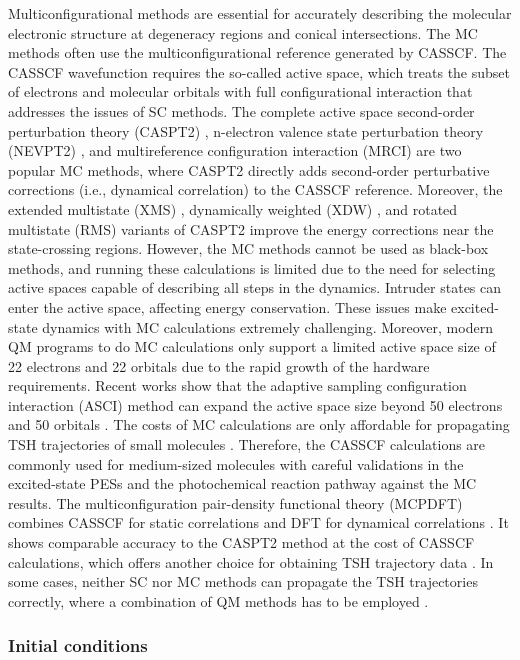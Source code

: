 \documentclass[9pt,bestpractices]{livecoms}
\begin{document}
Multiconfigurational methods are essential for accurately describing the molecular electronic structure at degeneracy regions and conical intersections. The MC methods often use the multiconfigurational reference generated by CASSCF. The CASSCF wavefunction requires the so-called active space, which treats the subset of electrons and molecular orbitals with full configurational interaction that addresses the issues of SC methods. The complete active space second-order perturbation theory (CASPT2) \cite{RN70}, n-electron valence state perturbation theory (NEVPT2) \cite{RN1}, and multireference configuration interaction (MRCI) \cite{RN117, RN56, RN57} are two popular MC methods, where CASPT2 directly adds second-order perturbative corrections (i.e., dynamical correlation) to the CASSCF reference. Moreover, the extended multistate (XMS) \cite{RN55}, dynamically weighted (XDW) \cite{RN54}, and rotated multistate (RMS) \cite{RN53} variants of CASPT2 improve the energy corrections near the state-crossing regions. However, the MC methods cannot be used as black-box methods, and running these calculations is limited due to the need for selecting active spaces capable of describing all steps in the dynamics. Intruder states can enter the active space, affecting energy conservation. These issues make excited-state dynamics with MC calculations extremely challenging. Moreover, modern QM programs to do MC calculations only support a limited active space size of 22 electrons and 22 orbitals due to the rapid growth of the hardware requirements. Recent works show that the adaptive sampling configuration interaction (ASCI) method can expand the active space size beyond 50 electrons and 50 orbitals \cite{RN51, RN52}. The costs of MC calculations are only affordable for propagating TSH trajectories of small molecules \cite{RN50, RN49}. Therefore, the CASSCF calculations are commonly used for medium-sized molecules \cite{RN48, RN47, RN46} with careful validations in the excited-state PESs and the photochemical reaction pathway against the MC results. The multiconfiguration pair-density functional theory (MCPDFT) combines CASSCF for static correlations and DFT for dynamical correlations \cite{RN45, RN44}. It shows comparable accuracy to the CASPT2 method at the cost of CASSCF calculations, which offers another choice for obtaining TSH trajectory data \cite{RN43}. In some cases, neither SC nor MC methods can propagate the TSH trajectories correctly, where a combination of QM methods has to be employed \cite{RN104, RN124}.

\subsubsection{Initial conditions}
\label{sec:initcond}
\end{document}
